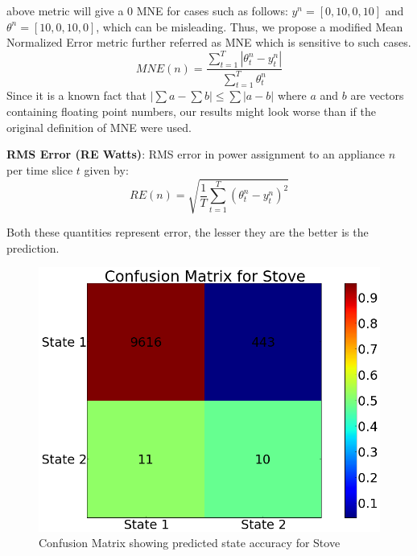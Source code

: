 \documentclass[conference]{IEEEtran}
\begin{document}
\noindent above metric will give a 0 MNE for cases such as follows: $y^n=[0,10,0,10]$ and $\theta^n=[10,0,10,0]$, which can be misleading. Thus, we propose a modified Mean Normalized Error metric further referred as MNE which is sensitive to such cases.
\begin{equation}
MNE(n)=\frac{\sum\limits_{t=1}^{T}|\theta_t^n-y_t^n|}{\sum\limits_{t=1}^{T}\theta_t^n} 
\end{equation} 
\noindent Since it is a known fact that $|\sum a-\sum b| \le \sum|a-b|$ where $a$ and $b$ are vectors containing floating point numbers, our results might look worse than if the original definition of MNE were used.

\noindent\textbf{RMS Error (RE Watts)}: RMS error in power assignment to an appliance $n$ per time slice $t$ given by:
\begin{equation}
RE(n)=\sqrt{\frac{1}{T}\sum\limits_{t=1}^{T}(\theta_t^n-y_t^n)^2}
\end{equation}


\noindent Both these quantities represent error, the lesser they are the better is the prediction.
\begin{figure}
\centering \includegraphics[scale=0.2]{./figures/confusion_stove.png}
\caption{Confusion Matrix showing predicted state accuracy for Stove}
   \label{fig:confusion}
\end{figure}
\end{document}
